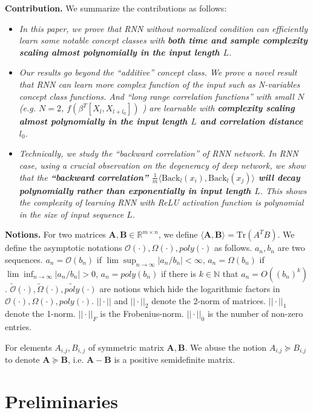 \documentclass{article}
\newcommand{\cO}{\mathcal{O}}
\begin{document}
{\bf Contribution.} We summarize the contributions as follows:
\begin{itemize}
\item[$\bullet$] \emph{In this paper, we prove that RNN without normalized condition can efficiently learn some notable concept classes  with {\bf both time and sample complexity scaling almost polynomially in the input length $L$}.}
\item[$\bullet$] \emph{Our results go beyond the ``additive'' concept class. We prove a novel result that RNN can learn more complex function of the input such as N-variables concept class functions. And ``long range correlation functions'' with small $N$ (e.g. $N=2$, $f(\beta^T[X_l,X_{l+l_0}])$ ) are learnable with {\bf complexity scaling almost polynomially in the input length $L$ and correlation distance $l_0$}.}
\item[$\bullet$] \emph{Technically, we study the ``backward correlation'' of RNN network. In RNN case, using a crucial observation on the degeneracy of deep network, we show that the {\bf ``backward correlation'' $\frac{1}{m}\langle \text{Back}_l(x_i),\text{Back}_{l}(x_j) \rangle$ will decay polynomially rather than exponentially in input length $L$}. This shows the complexity of learning RNN with ReLU activation function is polynomial in the size of input sequence $L$.}
\end{itemize}

{\bf Notions.}
For two matrices $\bm{A}, \bm{B}\in \mathbb{R}^{m\times n}$, we define $\langle \bm{A}, \bm{B} \rangle= \text{Tr}(A^TB)$. We define the asymptotic
notations $\cO(\cdot), \Omega(\cdot),poly(\cdot)$ as follows.  $a_n, b_n$ are two sequences. $a_n=\cO(b_n)$ if $\lim \sup_{n\to \infty}|a_n/b_n|< \infty$, $a_n=\Omega(b_n)$ if
$\lim \inf_{n\to \infty}|a_n/b_n|>0$, $a_n=poly(b_n)$ if there is $k\in \mathbb{N}$ that $a_n=O((b_n)^k)$. $\widetilde{\cO}(\cdot), \widetilde{\Omega}(\cdot), \widetilde{poly}(\cdot)$ are notions which hide the logarithmic factors in $\cO(\cdot), \Omega(\cdot), poly(\cdot)$. $||\cdot ||$ and $||\cdot||_2$ denote the 2-norm of matrices. $||\cdot ||_1$ denote the 1-norm. $||\cdot ||_F$ is the Frobenius-norm. $||\cdot||_0$ is the number of non-zero entries.

For elements $A_{i.j}, B_{i,j}$ of symmetric matrix $\bm{A}, \bm{B}$. We abuse the notion $A_{i.j}\succeq B_{i.j}$ to denote $\bm{A}\succeq \bm{B}$, i.e. $\bm{A}-\bm{B}$ is a positive semidefinite matrix.
\section{Preliminaries}
\end{document}
